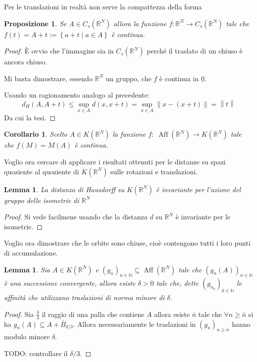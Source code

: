 \documentclass[a4paper,10pt]{article}
\newcounter{counter1}
\theoremstyle{plain}
\newtheorem{mylem}[counter1]{Lemma}
\newtheorem{mypro}[counter1]{Proposizione}
\newtheorem{mycor}[counter1]{Corollario}
\theoremstyle{definition}
\theoremstyle{remark}
\newcommand{\ubar}[1]{\underline{#1}}
\newcommand{\set}[1]{\left\{#1\right\}}
\newcommand{\pa}[1]{\left(#1\right)}
\newcommand{\norm}[1]{\left\|#1\right\|}
\DeclareMathOperator{\aff}{Aff}
\begin{document}
Per le translazioni in realtà non serve la compattezza della forma
\begin{mypro}
  Se $A \in C_s(\mathbb{R}^N)$ allora la funzione $f: \mathbb{R}^N \to
  C_s(\mathbb{R}^N)$ tale che $f(t) = A + t := \set { a + t \mid a \in
    A}$ è continua.
\end{mypro}
\begin{proof}
  È ovvio che l'immagine sia in $C_s(\mathbb{R}^N)$ perché il traslato
  di un chiuso è ancora chiuso.
  
  Mi basta dimostrare, essendo $\mathbb{R}^N$ un gruppo, che $f$ è
  continua in $\ubar{0}$.
  
  Usando un ragionamento analogo al precedente:
  \[ d_H(A, A+t) \le \sup _{x \in A} d(x, x+t) = \sup _{x \in A}
  \norm{x-(x+t)} = \norm{t} \]
  Da cui la tesi.
\end{proof}

\begin{mycor}
  Scelto $A \in K(\mathbb{R}^N)$ la funzione $f:\; \aff( \mathbb{R}^N)
  \to K(\mathbb{R}^N)$ tale che $f(M) = M(A)$ è continua.
\end{mycor}

Voglio ora cercare di applicare i risultati ottenuti per le distanze
su spazi quoziente al quoziente di $K(\mathbb{R}^N)$ sulle rotazioni e
translazioni.

\begin{mylem}
  La distanza di Hausdorff su $K(\mathbb{R}^N)$ è invariante per
  l'azione del gruppo delle isometrie di $\mathbb{R}^N$
\end{mylem}
\begin{proof}
  Si vede facilmene usando che la distanza $d$ su $\mathbb{R}^N$ è
  invariante per le isometrie.
\end{proof}

Voglio ora dimostrare che le orbite sono chiuse, cioè contengono tutti
i loro punti di accumulazione.

\begin{mylem}
  Sia $A \in K(\mathbb{R}^N)$ e $\pa{ g_n} _{n \in \mathbb{N}}
  \subseteq \aff( \mathbb{R}^N)$ tale che $\pa{ g_n(A) } _{n \in
    \mathbb{N}}$ è una successione convergente, allora esiste $\delta
  >0$ tale che, dette $\pa{ g_{n_k}} _{k\in \mathbb{N}}$ le affinità
  che utilizzano traslazioni di norma minore di $\delta$.
\end{mylem}
\begin{proof}
  Sia $\frac{\delta}{3}$ il raggio di una palla che contiene $A$
  allora esiste $\bar n$ tale che $\forall n \ge \bar n$ si ha $g_n(A)
  \subseteq A + \bar B _{\delta /3}$. Allora necessariamente le
  traslazioni in $\pa{g_n}_{n \ge \bar n}$ hanno modulo minore
  $\delta$.

  TODO: controllare il $\delta /3$.
\end{proof}
\end{document}
